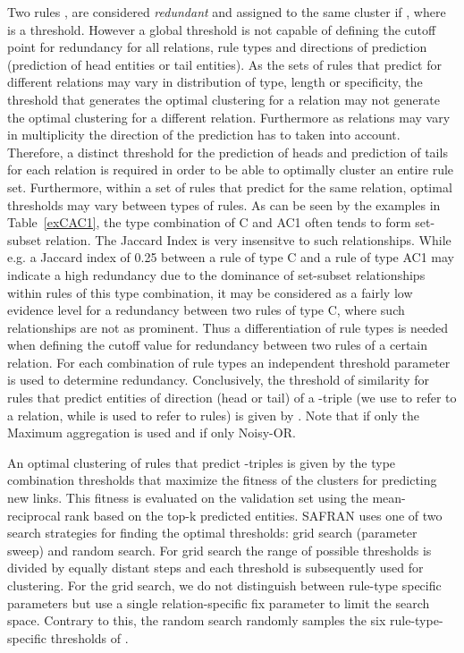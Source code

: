 \documentclass[akbc,twoside,11pt,lettersize]{article}
\begin{document}
Two rules ,  are considered \textit{redundant} and assigned to the same cluster if , where  is a threshold. However a global threshold  is not capable of defining the cutoff point for redundancy for all relations, rule types and directions of prediction (prediction of head entities or tail entities). As the sets of rules that predict for different relations may vary in distribution of type, length or specificity, the threshold that generates the optimal clustering for a relation may not generate the optimal clustering for a different relation. Furthermore as relations may vary in multiplicity the direction of the prediction has to taken into account. Therefore, a distinct threshold for the prediction of heads and prediction of tails for each relation is required in order to be able to optimally cluster an entire rule set. Furthermore, within a set of rules that predict for the same relation, optimal thresholds may vary between types of rules. As can be seen by the examples in Table~\ref{exCAC1}, the type combination of C and AC1 often tends to form set-subset relation. The Jaccard Index is very insensitve to such relationships. While e.g. a Jaccard index of 0.25 between a rule of type C and a rule of type AC1 may indicate a high redundancy due to the dominance of set-subset relationships within rules of this type combination, it may be considered as a fairly low evidence level for a redundancy between two rules of type C, where such relationships are not as prominent. Thus a differentiation of rule types is needed when defining the cutoff value for redundancy between two rules of a certain relation. For each combination of rule types an independent threshold parameter is used to determine redundancy. Conclusively, the threshold of similarity for rules that predict entities of direction  (head or tail) of a -triple (we use  to refer to a relation, while  is used to refer to rules) is given by . Note that if  only the Maximum aggregation is used and if  only Noisy-OR.

An optimal clustering of rules that predict -triples is given by the type combination thresholds  that maximize the fitness of the clusters for predicting new links. This fitness is evaluated on the validation set using the mean-reciprocal rank based on the top-k predicted entities. 
SAFRAN uses one of two search strategies for finding the optimal thresholds: grid search (parameter sweep) and random search. For grid search the range of possible thresholds  is divided by  equally distant steps and each threshold is subsequently used for clustering. For the grid search, we do not distinguish between rule-type specific parameters but use a single relation-specific fix parameter  to limit the search space. Contrary to this, the random search randomly samples the six rule-type-specific thresholds of . 
\end{document}
